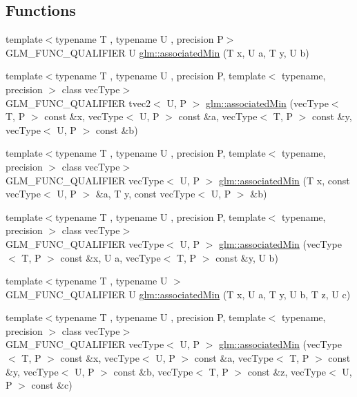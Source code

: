 \subsection*{Functions}
\begin{DoxyCompactItemize}
\item 
{\footnotesize template$<$typename T , typename U , precision P$>$ }\\G\+L\+M\+\_\+\+F\+U\+N\+C\+\_\+\+Q\+U\+A\+L\+I\+F\+I\+E\+R U \hyperlink{group__gtx__associated__min__max_gacc01bd272359572fc28437ae214a02df}{glm\+::associated\+Min} (T x, U a, T y, U b)
\item 
{\footnotesize template$<$typename T , typename U , precision P, template$<$ typename, precision $>$ class vec\+Type$>$ }\\G\+L\+M\+\_\+\+F\+U\+N\+C\+\_\+\+Q\+U\+A\+L\+I\+F\+I\+E\+R tvec2$<$ U, P $>$ \hyperlink{group__gtx__associated__min__max_ga8b538d10872626668a078e2bd495af25}{glm\+::associated\+Min} (vec\+Type$<$ T, P $>$ const \&x, vec\+Type$<$ U, P $>$ const \&a, vec\+Type$<$ T, P $>$ const \&y, vec\+Type$<$ U, P $>$ const \&b)
\item 
{\footnotesize template$<$typename T , typename U , precision P, template$<$ typename, precision $>$ class vec\+Type$>$ }\\G\+L\+M\+\_\+\+F\+U\+N\+C\+\_\+\+Q\+U\+A\+L\+I\+F\+I\+E\+R vec\+Type$<$ U, P $>$ \hyperlink{group__gtx__associated__min__max_ga1dccff48fa5650c746533de83467da6e}{glm\+::associated\+Min} (T x, const vec\+Type$<$ U, P $>$ \&a, T y, const vec\+Type$<$ U, P $>$ \&b)
\item 
{\footnotesize template$<$typename T , typename U , precision P, template$<$ typename, precision $>$ class vec\+Type$>$ }\\G\+L\+M\+\_\+\+F\+U\+N\+C\+\_\+\+Q\+U\+A\+L\+I\+F\+I\+E\+R vec\+Type$<$ U, P $>$ \hyperlink{group__gtx__associated__min__max_ga076717f4e07c6ae725cc1382d1ac4869}{glm\+::associated\+Min} (vec\+Type$<$ T, P $>$ const \&x, U a, vec\+Type$<$ T, P $>$ const \&y, U b)
\item 
{\footnotesize template$<$typename T , typename U $>$ }\\G\+L\+M\+\_\+\+F\+U\+N\+C\+\_\+\+Q\+U\+A\+L\+I\+F\+I\+E\+R U \hyperlink{group__gtx__associated__min__max_gad0aa8f86259a26d839d34a3577a923fc}{glm\+::associated\+Min} (T x, U a, T y, U b, T z, U c)
\item 
{\footnotesize template$<$typename T , typename U , precision P, template$<$ typename, precision $>$ class vec\+Type$>$ }\\G\+L\+M\+\_\+\+F\+U\+N\+C\+\_\+\+Q\+U\+A\+L\+I\+F\+I\+E\+R vec\+Type$<$ U, P $>$ \hyperlink{group__gtx__associated__min__max_ga5bc6b9acbf9e060d58a342fbe3b73d43}{glm\+::associated\+Min} (vec\+Type$<$ T, P $>$ const \&x, vec\+Type$<$ U, P $>$ const \&a, vec\+Type$<$ T, P $>$ const \&y, vec\+Type$<$ U, P $>$ const \&b, vec\+Type$<$ T, P $>$ const \&z, vec\+Type$<$ U, P $>$ const \&c)

\end{DoxyCompactItemize}
